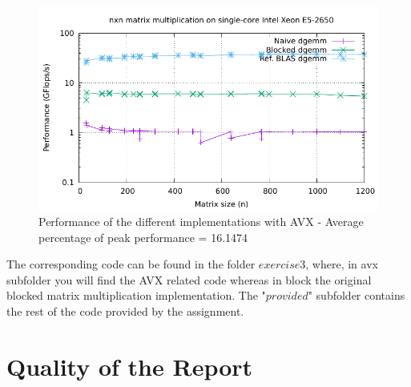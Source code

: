 \documentclass[unicode,11pt,a4paper,oneside,numbers=endperiod,openany]{scrartcl}
\begin{document}
\begin{figure}[H]
    \centering
    \includegraphics[width=\textwidth]{./exercise3/avx/timing-avx.pdf}
    \caption{Performance of the different implementations with AVX - Average percentage of peak performance = 16.1474} 
\end{figure}

The corresponding code can be found in the folder $exercise3$, where, in avx subfolder you will find the AVX related code whereas in block the original blocked matrix multiplication implementation.
The "$provided$" subfolder contains the rest of the code provided by the assignment.
\section{Quality of the Report  }
\end{document}
